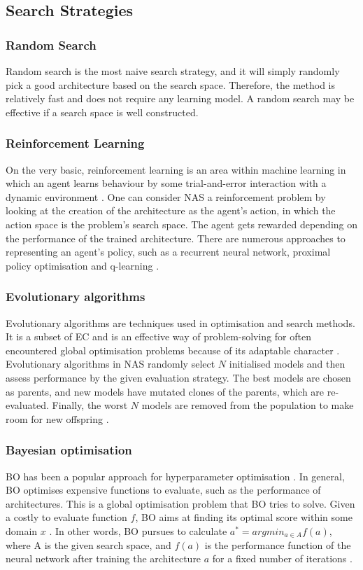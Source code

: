\subsection{Search Strategies}

\subsubsection{Random Search}
Random search is the most naive search strategy, and it will simply randomly pick a good architecture based on the search space. Therefore, the method is relatively fast and does not require any learning model. A random search may be effective if a search space is well constructed.  

\subsubsection{Reinforcement Learning}
On the very basic, reinforcement learning is an area within machine learning in which an agent learns behaviour by some trial-and-error interaction with a dynamic environment \autocite{kaelbling1996reinforcement}. One can consider NAS a reinforcement problem by looking at the creation of the architecture as the agent's action, in which the action space is the problem's search space. The agent gets rewarded depending on the performance of the trained architecture. There are numerous approaches to representing an agent's policy, such as a recurrent neural network, proximal policy optimisation and q-learning \autocite{elsken2019neural}. 

\subsubsection{Evolutionary algorithms}
Evolutionary algorithms are techniques used in optimisation and search methods. It is a subset of \gls{EC} and is an effective way of problem-solving for often encountered global optimisation problems because of its adaptable character \autocite{7955308}. Evolutionary algorithms in NAS randomly select $N$ initialised models and then assess performance by the given evaluation strategy. The best models are chosen as parents, and new models have mutated clones of the parents, which are re-evaluated. Finally, the worst $N$ models are removed from the population to make room for new offspring \autocite{https://doi.org/10.48550/arxiv.1703.01041}. 

\subsubsection{Bayesian optimisation}
\Gls{BO} has been a popular approach for hyperparameter optimisation \autocite{elsken2019neural}. In general, BO optimises expensive functions to evaluate, such as the performance of architectures. This is a global optimisation problem that BO tries to solve. Given a costly to evaluate function $f$, BO aims at finding its optimal score within some domain $x$ \autocite{kandasamy2018neural}. In other words, BO pursues to calculate $a^* = arg min_{a \in A} f(a)$, where A is the given search space, and $f(a)$ is the performance function of the neural network after training the architecture $a$ for a fixed number of iterations \autocite{white2021bananas}.  
